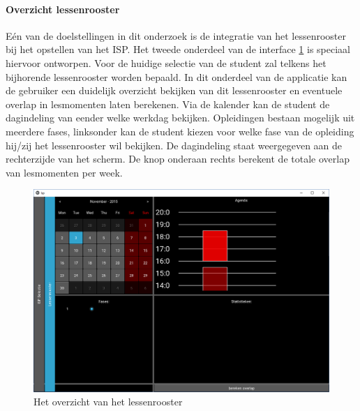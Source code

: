 \paragraph{Overzicht lessenrooster} 
E\'{e}n van de doelstellingen in dit onderzoek is de integratie van het lessenrooster bij het opstellen van het ISP. Het tweede onderdeel van de interface \ref{fig:sc2} is speciaal hiervoor ontworpen. Voor de huidige selectie van de student zal telkens het bijhorende lessenrooster worden bepaald. In dit onderdeel van de applicatie kan de gebruiker een duidelijk overzicht bekijken van dit lessenrooster en eventuele overlap in lesmomenten laten berekenen. Via de kalender kan de student de dagindeling van eender welke werkdag bekijken. Opleidingen bestaan mogelijk uit meerdere fases, linksonder kan de student kiezen voor welke fase van de opleiding hij/zij het lessenrooster wil bekijken. De dagindeling staat weergegeven aan de rechterzijde van het scherm. De knop onderaan rechts berekent de totale overlap van lesmomenten per week.

\begin{figure}
\caption{Het overzicht van het lessenrooster\label{fig:sc2}}
\centering
\includegraphics[scale=.35]{sc2.png}
\end{figure}


